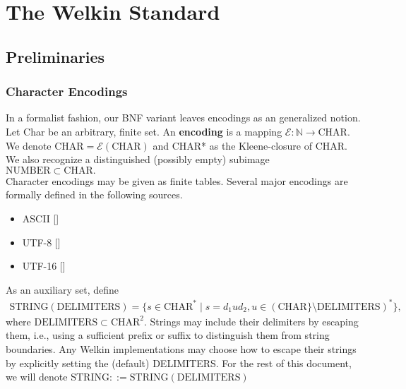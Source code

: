 

\chapter{The Welkin Standard}

\section{Preliminaries}

\newcommand*{\chars}{\mathrm{CHAR}}
\newcommand*{\bytes}{\mathrm{BYTES}}
\newcommand*{\numbers}{\mathrm{NUMBER}}
\newcommand*{\strings}{\mathrm{STRING}}
\newcommand*{\term}{\mathrm{term}}
\newcommand*{\terms}{\mathrm{terms}}
\newcommand*{\delimiters}{\mathrm{DELIMITERS}}
\newcommand*{\encoding}{\mathcal{E}}

\subsection{Character Encodings}
In a formalist fashion, our BNF variant leaves encodings as an generalized notion. Let Char be an arbitrary, finite set.
An \textbf{encoding} is a mapping $\encoding : \mathbb{N} \to \chars.$
We denote $\chars = \encoding(\chars)$ and CHAR* as the Kleene-closure of CHAR. We also recognize a distinguished (possibly empty) subimage $\numbers \subset \chars.$ %
\\ Character encodings may be given as finite tables. Several major encodings are formally defined in the following sources.
\begin{itemize}
	\item ASCII []
	\item UTF-8 []
	\item UTF-16 []
\end{itemize}
As an auxiliary set, define
\begin{align*}
	\strings(\delimiters) = \{s \in \chars^{*}\;|\; s = d_{1} u d_{2}, u \in (\chars\} \setminus \delimiters)^{*}\},\end{align*}
where $\delimiters \subset \chars^{2}.$
Strings may include their delimiters by escaping them, i.e., using a sufficient prefix or suffix to distinguish them from string boundaries. Any Welkin implementations may choose how to escape their strings by explicitly setting the (default) DELIMITERS. For the rest of this document, we will denote $\strings ::= \strings(\delimiters)$

